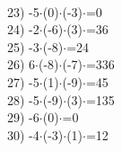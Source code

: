 \documentclass[a4paper,10pt]{article}
\begin{document}
\vspace{0.5cm}\\23)   -5$\cdot$(0)$\cdot$(-3)$\cdot$=0
\vspace{0.5cm}\\24)   -2$\cdot$(-6)$\cdot$(3)$\cdot$=36
\vspace{0.5cm}\\25)   -3$\cdot$(-8)$\cdot$=24
\vspace{0.5cm}\\26)   6$\cdot$(-8)$\cdot$(-7)$\cdot$=336
\vspace{0.5cm}\\27)   -5$\cdot$(1)$\cdot$(-9)$\cdot$=45
\vspace{0.5cm}\\28)   -5$\cdot$(-9)$\cdot$(3)$\cdot$=135
\vspace{0.5cm}\\29)   -6$\cdot$(0)$\cdot$=0
\vspace{0.5cm}\\30)   -4$\cdot$(-3)$\cdot$(1)$\cdot$=12
\vspace{0.5cm}\\\pagebreak
\end{document}
